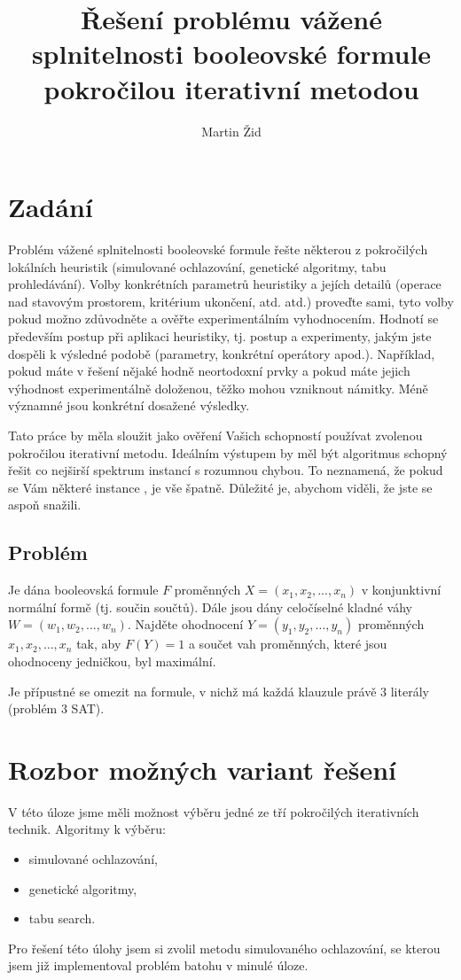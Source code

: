 \documentclass[10pt,a4paper]{article}
\author{Martin Žid}
\title{Řešení problému vážené splnitelnosti booleovské formule pokročilou iterativní metodou}
\date{}
\begin{document}
\maketitle

\section{Zadání}
Problém vážené splnitelnosti booleovské formule řešte některou z pokročilých lokálních heuristik (simulované ochlazování, genetické algoritmy, tabu prohledávání). Volby konkrétních parametrů heuristiky a jejích detailů (operace nad stavovým prostorem, kritérium ukončení, atd. atd.) proveďte sami, tyto volby pokud možno zdůvodněte a ověřte experimentálním vyhodnocením. Hodnotí se především postup při aplikaci heuristiky, tj. postup a experimenty, jakým jste dospěli k výsledné podobě (parametry, konkrétní operátory apod.). Například, pokud máte v řešení nějaké hodně neortodoxní prvky a pokud máte jejich výhodnost experimentálně doloženou, těžko mohou vzniknout námitky. Méně významné jsou konkrétní dosažené výsledky.

Tato práce by měla sloužit jako ověření Vašich schopností používat zvolenou pokročilou iterativní metodu. Ideálním výstupem by měl být algoritmus schopný řešit co nejširší spektrum instancí s rozumnou chybou. To neznamená, že pokud se Vám některé instance , je vše špatně. Důležité je, abychom viděli, že jste se aspoň snažili.

 \subsection{Problém}
Je dána booleovská formule $F$ proměnných $X=(x_1, x_2, ..., x_n)$ v konjunktivní normální formě (tj. součin součtů). Dále jsou dány celočíselné kladné váhy $W=(w_1, w_2,... , w_n)$. Najděte ohodnocení $Y=(y_1, y_2, … , y_n)$ proměnných $x_1, x_2, … , x_n$ tak, aby $F(Y)=1$ a součet vah proměnných, které jsou ohodnoceny jedničkou, byl maximální.
 
Je přípustné se omezit na formule, v nichž má každá klauzule právě 3 literály (problém 3 SAT).

\section{Rozbor možných variant řešení}
V této úloze jsme měli možnost výběru jedné ze tří pokročilých iterativních technik.
Algoritmy k výběru:
\begin{itemize}
 \item simulované ochlazování,
 \item genetické algoritmy,
 \item tabu search.
\end{itemize}
Pro řešení této úlohy jsem si zvolil metodu simulovaného ochlazování, se kterou jsem již implementoval problém batohu v minulé úloze.
\end{document}
